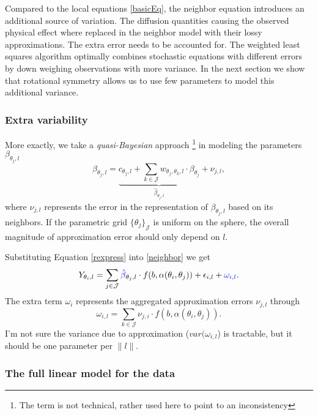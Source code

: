 \documentclass[11pt]{amsart}
\newcommand{\tj}{\theta_j}
\newcommand{\ti}{\theta_i}
\newcommand{\ytil}{Y_{\theta_i,l}}
\begin{document}
Compared to the local equations \eqref{basicEq}, the neighbor equation introduces an additional source of variation. 
The diffusion quantities causing the observed physical effect where replaced in the neighbor model with their lossy approximations.
The extra error needs to be accounted for. 
The weighted least squares algorithm optimally combines stochastic equations with different errors by
down weighing observations with more variance. In the next section we show that rotational symmetry 
allows us to use few parameters to model this additional variance. 


\subsubsection{Extra variability}
More exactly, we take a \emph{quasi-Bayesian} approach \footnote{The term is not technical, rather used here to point to an inconsistency}
in modeling the parameters $\beta_{\tj,l}$
\begin{equation}
\beta_{\tj,l} = \underbrace{c_{\tj,l} + \sum_{k\in\mathcal{J}} w_{\theta_j,\theta_k, l} \cdot \beta_{\tj}}_{\hat{\beta}_{\tj,l}} + \nu_{j,l}, 
\label{rexpress}
\end{equation}
where $\nu_{j,l}$ represents the error in the representation of $\beta_{\tj,l}$ based on its neighbors. 
If the parametric grid $\{\tj\}_\mathcal{J}$ is uniform on the sphere, the overall magnitude of approximation error 
should only depend on $l$. 

Substituting Equation \eqref{rexpress} into \eqref{neighbor} we get
\begin{equation}
\ytil = \sum_{j \in \mathcal{J}} \textcolor{blue}{\hat{\beta}}_{\tj,l} \cdot f(b, \alpha(\ti, \tj)) + \epsilon_{i,l} +  \textcolor{blue}{\omega_{i,l}}.
\end{equation}
The extra term $\omega_i$ represents the aggregated approximation errors $\nu_{j,l}$ through
\[ \omega_{i,l} = \sum_{k\in\mathcal{J}} \nu_{j,i} \cdot f(b, \alpha(\ti, \tj)).\]
I'm not sure the variance due to approximation ($var(\omega_{i,l}$) is tractable, but it should be one parameter per $\|l\|$. 

\subsubsection{The full linear model for the data}




%
\end{document}
